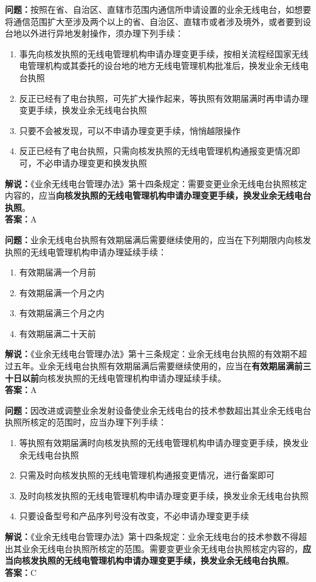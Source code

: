 \noindent\textbf{问题：}按照在省、自治区、直辖市范围内通信所申请设置的业余无线电台，如想要将通信范围扩大至涉及两个以上的省、自治区、直辖市或者涉及境外，或者要到设台地以外进行异地发射操作，须办理下列手续：
\begin{enumerate}[label=\Alph*), leftmargin=3em]
\item 事先向核发执照的无线电管理机构申请办理变更手续，按相关流程经国家无线电管理机构或其委托的设台地的地方无线电管理机构批准后，换发业余无线电台执照
\item 反正已经有了电台执照，可先扩大操作起来，等执照有效期届满时再申请办理变更手续，换发业余无线电台执照
\item 只要不会被发现，可以不申请办理变更手续，悄悄越限操作
\item 反正已经有了电台执照，只需向核发执照的无线电管理机构通报变更情况即可，不必申请办理变更和换发执照
\end{enumerate}
\noindent\textbf{解说：}《业余无线电台管理办法》第十四条规定：需要变更业余无线电台执照核定内容的，应当\textbf{向核发执照的无线电管理机构申请办理变更手续，换发业余无线电台执照}。\\\noindent\textbf{答案：}A

\bigskip


\noindent\textbf{问题：}业余无线电台执照有效期届满后需要继续使用的，应当在下列期限内向核发执照的无线电管理机构申请办理延续手续：
\begin{enumerate}[label=\Alph*), leftmargin=3em]
\item 有效期届满一个月前
\item 有效期届满一个月之内
\item 有效期届满三个月之内
\item 有效期届满二十天前
\end{enumerate}
\noindent\textbf{解说：}《业余无线电台管理办法》第十三条规定：业余无线电台执照的有效期不超过五年。业余无线电台执照有效期届满后需要继续使用的，应当在\textbf{有效期届满前三十日以前}向核发执照的无线电管理机构申请办理延续手续。\\\noindent\textbf{答案：}A


\bigskip


\noindent\textbf{问题：}因改进或调整业余发射设备使业余无线电台的技术参数超出其业余无线电台执照所核定的范围时，应当办理下列手续：
\begin{enumerate}[label=\Alph*), leftmargin=3em]
\item 等执照有效期届满时向核发执照的无线电管理机构申请办理变更手续，换发业余无线电台执照
\item 只需及时向核发执照的无线电管理机构通报变更情况，进行备案即可
\item 及时向核发执照的无线电管理机构申请办理变更手续，换发业余无线电台执照
\item 只要设备型号和产品序列号没有改变，不必申请办理变更手续
\end{enumerate}
\noindent\textbf{解说：}《业余无线电台管理办法》第十四条规定：业余无线电台的技术参数不得超出其业余无线电台执照所核定的范围。需要变更业余无线电台执照核定内容的，\textbf{应当向核发执照的无线电管理机构申请办理变更手续，换发业余无线电台执照}。\\\noindent\textbf{答案：}C





